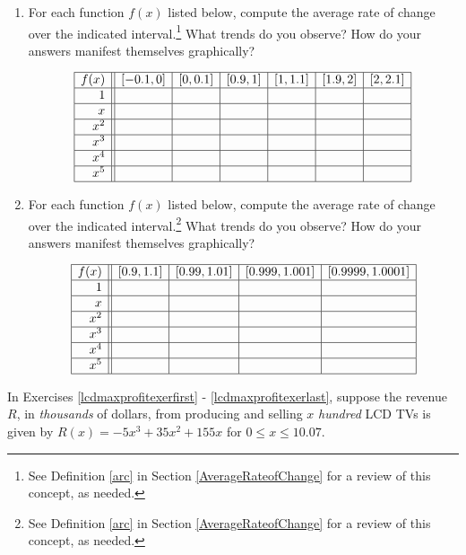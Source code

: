 \begin{enumerate}
\item For each function $f(x)$ listed below, compute the average rate of change over the indicated interval.\footnote{See Definition \ref{arc} in Section \ref{AverageRateofChange} for a review of this concept, as needed.}  What trends do you observe?  How do your answers manifest themselves graphically?

\[ \begin{array}{|r||c|c|c|c|c|c|}  \hline

 f(x) &  [-0.1, 0] & [0, 0.1] &[0.9, 1] & [1, 1.1] & [1.9, 2] & [2, 2.1]  \\ \hline
 1 &&&&&& \\  \hline
 x  &&&&&& \\  \hline
 x^2 &&&&&&  \\  \hline
 x^3 &&&&&& \\  \hline
 x^4 &&&&&& \\ \hline
 x^5 &&&&&& \\ \hline

\end{array} \]


\item \label{monomialarcexercise}For each function $f(x)$ listed below, compute the average rate of change over the indicated interval.\footnote{See Definition \ref{arc} in Section \ref{AverageRateofChange} for a review of this concept, as needed.}  What trends do you observe?  How do your answers manifest themselves graphically?

\[ \begin{array}{|r||c|c|c|c|}  \hline

 f(x) &  [0.9, 1.1] & [0.99, 1.01] &[0.999, 1.001] & [0.9999, 1.0001]  \\ \hline
 1 &&&&   \\  \hline
 x &&&&    \\  \hline
 x^2 &&&&   \\  \hline
 x^3 &&&&   \\  \hline
 x^4 &&&&  \\ \hline
 x^5 &&&&  \\ \hline

\end{array} \]




\setcounter{HW}{\value{enumi}}
\end{enumerate}

\label{LCDmaxprofit} 

In Exercises \ref{lcdmaxprofitexerfirst} - \ref{lcdmaxprofitexerlast}, suppose the revenue $R$, in \textit{thousands} of dollars, from producing and selling $x$ \textit{hundred} LCD TVs is given by $R(x) = -5x^3+35x^2+155x$ for $0 \leq x \leq 10.07$.

